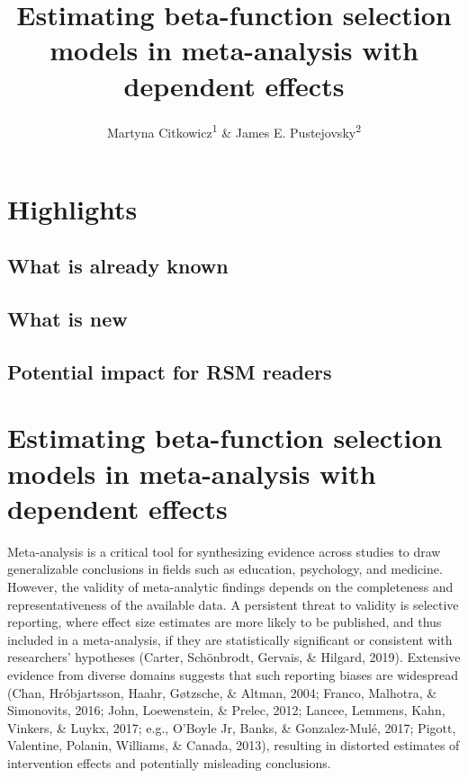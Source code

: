 \documentclass[
  man, donotrepeattitle,floatsintext]{apa7}
\title{Estimating beta-function selection models in meta-analysis with dependent effects}
\author{Martyna Citkowicz\textsuperscript{1} \& James E. Pustejovsky\textsuperscript{2}}
\date{}
\affiliation{\vspace{0.5cm}\textsuperscript{1} American Institutes for Research\\\textsuperscript{2} University of Wisconsin-Madison}
\begin{document}
\maketitle

\section*{Highlights}\label{highlights}

\subsection*{What is already known}\label{what-is-already-known}

\subsection*{What is new}\label{what-is-new}

\subsection*{Potential impact for RSM readers}\label{potential-impact-for-rsm-readers}

\newpage

\section{Estimating beta-function selection models in meta-analysis with dependent effects}\label{introduction}

Meta-analysis is a critical tool for synthesizing evidence across studies to draw generalizable conclusions in fields such as education, psychology, and medicine. However, the validity of meta-analytic findings depends on the completeness and representativeness of the available data. A persistent threat to validity is selective reporting, where effect size estimates are more likely to be published, and thus included in a meta-analysis, if they are statistically significant or consistent with researchers' hypotheses (Carter, Schönbrodt, Gervais, \& Hilgard, 2019). Extensive evidence from diverse domains suggests that such reporting biases are widespread (Chan, Hróbjartsson, Haahr, Gøtzsche, \& Altman, 2004; Franco, Malhotra, \& Simonovits, 2016; John, Loewenstein, \& Prelec, 2012; Lancee, Lemmens, Kahn, Vinkers, \& Luykx, 2017; e.g., O'Boyle Jr, Banks, \& Gonzalez-Mulé, 2017; Pigott, Valentine, Polanin, Williams, \& Canada, 2013), resulting in distorted estimates of intervention effects and potentially misleading conclusions.
\end{document}
